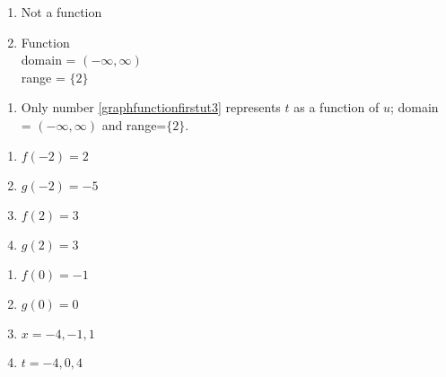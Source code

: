 \documentclass{ximera}
\begin{document}
\begin{multicols}{2}
\begin{enumerate}
\setcounter{enumi}{\value{HW}}

\item   Not a function

\vfill

\columnbreak

\item  Function \\ domain = $(-\infty, \infty)$ \\ range = $\{2\}$

\setcounter{HW}{\value{enumi}}
\end{enumerate}
\end{multicols}

\begin{enumerate}
\setcounter{enumi}{\value{HW}}

\item  Only number \ref{graphfunctionfirstut3} represents $t$ as a function of $u$;  domain = $(-\infty, \infty)$ and range=$\{2 \}$.

\setcounter{HW}{\value{enumi}}
\end{enumerate}


\begin{multicols}{4}

\begin{enumerate}

\setcounter{enumi}{\value{HW}}

\item  $f(-2) = 2$

\item $g(-2) = -5$

\item $f(2) = 3$

\item  $g(2) = 3$


\setcounter{HW}{\value{enumi}}

\end{enumerate}

\end{multicols}

\begin{multicols}{4}

\begin{enumerate}

\setcounter{enumi}{\value{HW}}

\item $f(0) = -1$

\item $g(0) = 0$

\item  $x  = -4, -1, 1$

\item  $t = -4, 0, 4$

\setcounter{HW}{\value{enumi}}

\end{enumerate}

\end{multicols}
\end{document}
